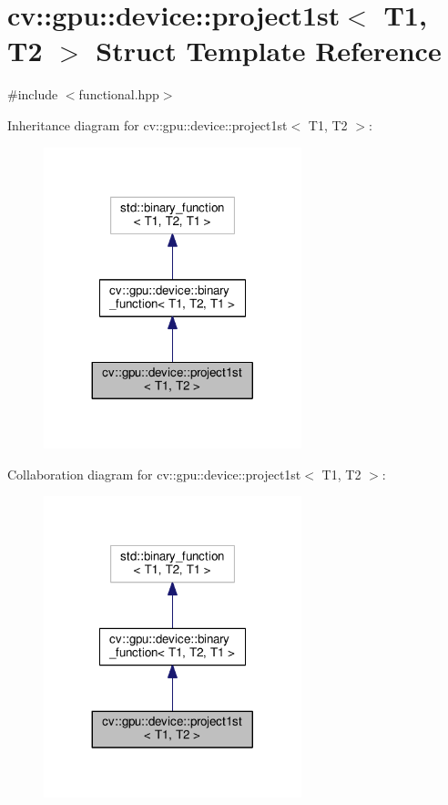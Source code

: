 \hypertarget{structcv_1_1gpu_1_1device_1_1project1st}{\section{cv\-:\-:gpu\-:\-:device\-:\-:project1st$<$ T1, T2 $>$ Struct Template Reference}
\label{structcv_1_1gpu_1_1device_1_1project1st}
}


{\ttfamily \#include $<$functional.\-hpp$>$}



Inheritance diagram for cv\-:\-:gpu\-:\-:device\-:\-:project1st$<$ T1, T2 $>$\-:\nopagebreak
\begin{figure}[H]
\begin{center}
\leavevmode
\includegraphics[width=212pt]{structcv_1_1gpu_1_1device_1_1project1st__inherit__graph}
\end{center}
\end{figure}


Collaboration diagram for cv\-:\-:gpu\-:\-:device\-:\-:project1st$<$ T1, T2 $>$\-:\nopagebreak
\begin{figure}[H]
\begin{center}
\leavevmode
\includegraphics[width=212pt]{structcv_1_1gpu_1_1device_1_1project1st__coll__graph}
\end{center}
\end{figure}
